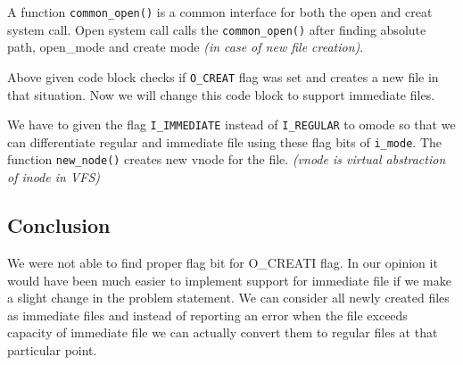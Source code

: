 \begin{small}

\end{small}



A function \texttt{common\_open()} is a common interface for both the open and creat system call. Open system call calls the \texttt{common\_open()} after finding absolute path, open\_mode and create mode \emph{(in case of new file creation)}.


\begin{small}

\end{small}


Above given code block checks if \texttt{O\_CREAT} flag was set and creates a new file in that situation. Now we will change this code block to support immediate files.


\begin{small}

\end{small}


We have to given the flag \texttt{I\_IMMEDIATE} instead of \texttt{I\_REGULAR} to omode so that we can differentiate regular and immediate file using these flag bits of \texttt{i\_mode}. The function \texttt{new\_node()} creates new vnode for the file. \emph{(vnode is virtual abstraction of inode in VFS)}

\subsection{Conclusion}
We were not able to find proper flag bit for O\_CREATI flag. In our opinion it would have been much easier to implement support for immediate file if we make a slight change in the problem statement. We can consider all newly created files as immediate files and instead of reporting an error when the file exceeds capacity of immediate file we can actually convert them to regular files at that particular point. 